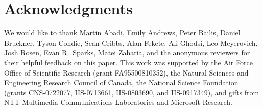 \section*{Acknowledgments}
We would like to thank Martin Abadi, Emily Andrews, Peter Bailis, Daniel
Bruckner, Tyson Condie, Sean Cribbs, Alan Fekete, Ali Ghodsi, Leo Meyerovich,
Josh Rosen, Evan R.\ Sparks, Matei Zaharia, and the anonymous reviewers for
their helpful feedback on this paper.  This work was supported by the Air Force
Office of Scientific Research (grant FA95500810352), the Natural Sciences and
Engineering Research Council of Canada, the National Science Foundation (grants
CNS-0722077, IIS-0713661, IIS-0803690, and IIS-0917349), and gifts from NTT
Multimedia Communications Laboratories and Microsoft Research.

